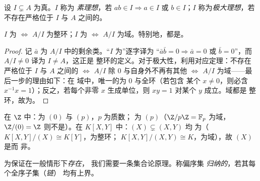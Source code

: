 \begin{definition}\label{def:b3:rings:primemaximal}
设 $I \subsetneq A$ 为真。$I$ 称为
\emph{素理想}，若 $ab \in I \Rightarrow a \in I$
或 $b \in I$；$I$ 称为\emph{极大理想}，若
不存在严格位于 $I$ 与 $A$ 之间的。
\end{definition}

\begin{proposition}\label{prop:b3:rings:primemaximal}
$I$ 为 $\iff$ $A/I$ 为整环；$I$ 为
$\iff$ $A/I$ 为域。特别地，都是。
\end{proposition}

\begin{proof}
记 $\bar a$ 为 $A/I$ 中的剩余类。“$I$ 为”逐字译为
“$\bar a\bar b = 0 \Rightarrow \bar a = 0$ 或 $\bar b
= 0$”，而 $A/I \neq 0$ 译为 $I \neq A$，这正是
整环的定义。对于极大性，利用对应定理：不存在
严格位于 $I$ 与 $A$ 之间的 $\iff$ $A/I$ 除
$0$ 与自身外不再有其他 $\iff$ $A/I$ 为域——最后一步的理由如下：在
域中，唯一的为 $0$ 与全环（若包含
某个 $x \ne 0$，则必含 $x^{-1}x = 1$）；反之，若每个非零 $x$
生成单位，则 $xy = 1$ 对某个 $y$ 成立。域都是
整环，故为。
\end{proof}

\begin{example}\label{ex:b3:rings:primemaximal}
在 $\Z$ 中：为 $(0)$ 与 $(p)$，$p$ 为质数；
为 $(p)$（$\Z/p\Z = \mathbb F_p$ 为域，
$\Z/(0) = \Z$ 则不是）。在 $K[X, Y]$ 中：$(X) \subsetneq (X, Y)$ 均
为（$K[X,Y]/(X) \cong K[Y]$，为整环；
$K[X,Y]/(X,Y) \cong K$，为域），故 $(X)$ 是而
非。
\end{example}

为保证在一般情形下\emph{存在}，
我们需要一条集合论原理。称偏序集
\emph{归纳的}，若其每个全序子集（\emph{链}）
均有上界。

